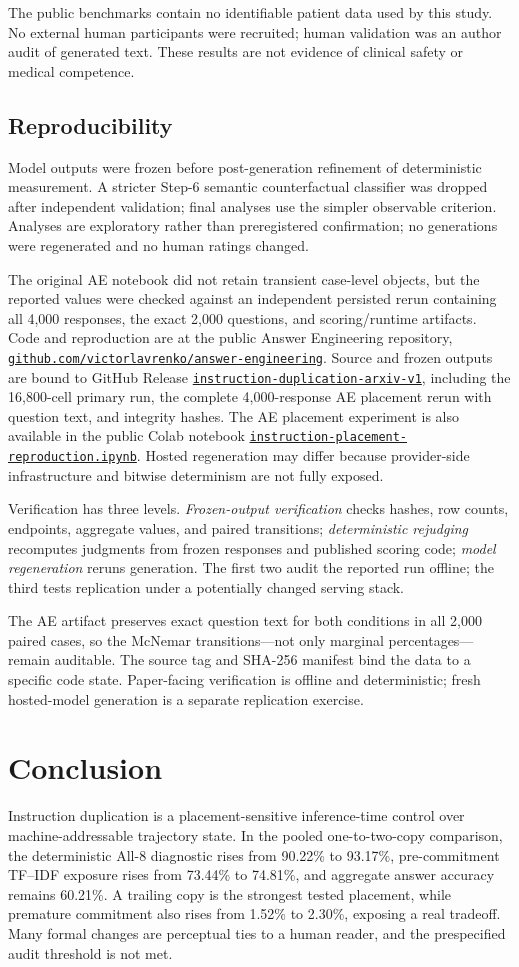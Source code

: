 \documentclass[10pt]{article}
\newcommand{\repo}{\href{https://github.com/victorlavrenko/answer-engineering}{\nolinkurl{github.com/victorlavrenko/answer-engineering}}}
\newcommand{\release}{\href{https://github.com/victorlavrenko/answer-engineering/releases/tag/instruction-duplication-arxiv-v1}{\texttt{instruction-duplication-arxiv-v1}}}
\newcommand{\colab}{\href{https://colab.research.google.com/github/victorlavrenko/answer-engineering/blob/main/notebooks/instruction-placement-reproduction.ipynb}{\texttt{instruction-placement-reproduction.ipynb}}}
\begin{document}
The public benchmarks contain no identifiable patient data used by this study. No external human participants were recruited; human validation was an author audit of generated text. These results are not evidence of clinical safety or medical competence.

\subsection{Reproducibility}
Model outputs were frozen before post-generation refinement of deterministic measurement. A stricter Step-6 semantic counterfactual classifier was dropped after independent validation; final analyses use the simpler observable criterion. Analyses are exploratory rather than preregistered confirmation; no generations were regenerated and no human ratings changed.

The original AE notebook did not retain transient case-level objects, but the reported values were checked against an independent persisted rerun containing all 4,000 responses, the exact 2,000 questions, and scoring/runtime artifacts. Code and reproduction are at the public Answer Engineering repository, \repo{}. Source and frozen outputs are bound to GitHub Release \release{}, including the 16,800-cell primary run, the complete 4,000-response AE placement rerun with question text, and integrity hashes. The AE placement experiment is also available in the public Colab notebook \colab{}. Hosted regeneration may differ because provider-side infrastructure and bitwise determinism are not fully exposed.

Verification has three levels. \emph{Frozen-output verification} checks hashes, row counts, endpoints, aggregate values, and paired transitions; \emph{deterministic rejudging} recomputes judgments from frozen responses and published scoring code; \emph{model regeneration} reruns generation. The first two audit the reported run offline; the third tests replication under a potentially changed serving stack.

The AE artifact preserves exact question text for both conditions in all 2,000 paired cases, so the McNemar transitions---not only marginal percentages---remain auditable. The source tag and SHA-256 manifest bind the data to a specific code state. Paper-facing verification is offline and deterministic; fresh hosted-model generation is a separate replication exercise.

\section{Conclusion}
Instruction duplication is a placement-sensitive inference-time control over machine-addressable trajectory state. In the pooled one-to-two-copy comparison, the deterministic All-8 diagnostic rises from 90.22\% to 93.17\%, pre-commitment TF--IDF exposure rises from 73.44\% to 74.81\%, and aggregate answer accuracy remains 60.21\%. A trailing copy is the strongest tested placement, while premature commitment also rises from 1.52\% to 2.30\%, exposing a real tradeoff. Many formal changes are perceptual ties to a human reader, and the prespecified audit threshold is not met.
\end{document}
